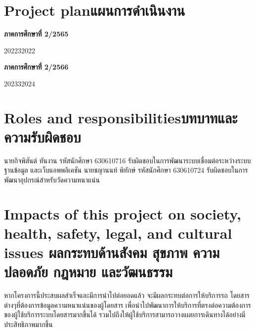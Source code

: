 \section{\ifenglish Project plan\else แผนการดำเนินงาน\fi}

\textbf{ภาคการศึกษาที่ 2/2565}
\begin{plan}{1}{2022}{3}{2022}
\end{plan}

\textbf{ภาคการศึกษาที่ 2/2566}
\begin{plan}{10}{2023}{3}{2024}
\end{plan}

\section{\ifenglish Roles and responsibilities\else บทบาทและความรับผิดชอบ\fi}

นายกิจพิสันต์ ทันงาน รหัสนักศึกษา 630610716 รับผิดชอบในการพัฒนาระบบเชื่อมต่อระหว่างระบบ ฐานข้อมูล และเว็บแอพพลิเคชัน
นายชญานนท์ พิทักษ์ รหัสนักศึกษา 630610724 รับผิดชอบในการพัฒนาอุปกรณ์สำหรับวัดความหนาแน่น
\section{\ifenglish%
Impacts of this project on society, health, safety, legal, and cultural issues
\else%
ผลกระทบด้านสังคม สุขภาพ ความปลอดภัย กฎหมาย และวัฒนธรรม
\fi}

หากโครงการนี้ประสบผลสําเร็จและมีการนําไปต่อยอดแล้ว จะมีผลกระทบต่อการให้บริการรถ
โดยสารต่างๆที่ต้องการข้อมูลความหนาแน่นของผู้โดยสาร เพื่อนำไปพัฒนาการให้บริการที่ตรงต่อความต้องการของผู้ใช้บริการระบบโดยสารมากขึ้นได้ รวมไปถึงให้ผู้ใช้บริการสามารถวางแผยการเดินทางได้อย่างมีประสิทธิภาพมากขึ้น

